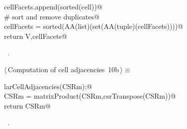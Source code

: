 \documentclass[11pt,oneside]{article}	%
\begin{document}
\begin{flushleft}
\begin{list}{}{}
\mbox{}\verb@            cellFacets.append(sorted(cell))@\\
\mbox{}\verb@   # sort and remove duplicates@\\
\mbox{}\verb@   cellFacets = sorted(AA(list)(set(AA(tuple)(cellFacets))))@\\
\mbox{}\verb@   return V,cellFacets@\\
\mbox{}\verb@@{\NWsep}
\end{list}
\vspace{-1ex}
\footnotesize\addtolength{\baselineskip}{-1ex}
\begin{list}{}{\setlength{\itemsep}{-\parsep}\setlength{\itemindent}{-\leftmargin}}
\item \NWtxtMacroRefIn\ .
\end{list}
\end{flushleft}



\begin{flushleft} \small \label{scrap19}
\protect{}$\langle\,$Computation of cell adjacencies\nobreak\ {\footnotesize 10b}$\,\rangle\equiv$
\vspace{-1ex}
\begin{list}{}{} \item
\mbox{}\verb@def larCellAdjacencies(CSRm):@\\
\mbox{}\verb@   CSRm = matrixProduct(CSRm,csrTranspose(CSRm))@\\
\mbox{}\verb@   return CSRm@\\
\mbox{}\verb@@{\NWsep}
\end{list}
\vspace{-1ex}
\footnotesize\addtolength{\baselineskip}{-1ex}
\begin{list}{}{\setlength{\itemsep}{-\parsep}\setlength{\itemindent}{-\leftmargin}}
\item \NWtxtMacroRefIn\ .
\end{list}
\end{flushleft}
\end{document}
